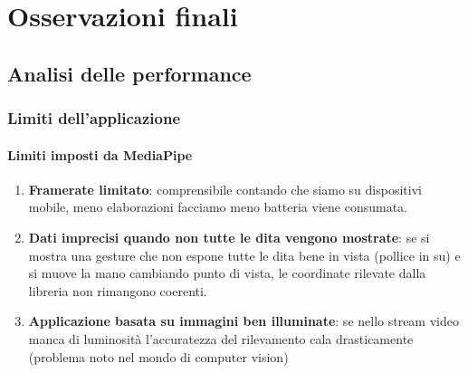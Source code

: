 \chapter{Osservazioni finali}

\section{Analisi delle performance}

\subsection{Limiti dell'applicazione}

\subsubsection{Limiti imposti da MediaPipe}
\begin{enumerate}
    \item \textbf{Framerate limitato}: comprensibile contando che siamo su dispositivi mobile, meno elaborazioni facciamo meno batteria viene consumata.
    \item \textbf{Dati imprecisi quando non tutte le dita vengono mostrate}: se si mostra una gesture che non espone tutte le dita bene in vista (pollice in su) e si muove la mano cambiando punto di vista, le coordinate rilevate dalla libreria non rimangono coerenti.
    \item \textbf{Applicazione basata su immagini ben illuminate}: se nello stream video manca di luminosità l'accuratezza del rilevamento cala drasticamente (problema noto nel mondo di computer vision)
\end{enumerate}

